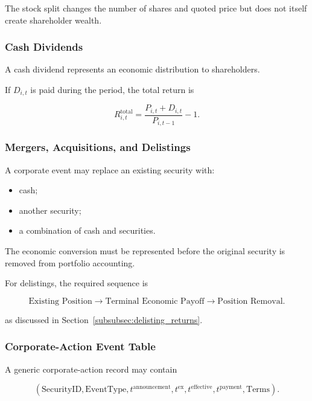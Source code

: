 \documentclass[11pt,a4paper]{article}
\begin{document}
The stock split changes the number of shares and quoted price but does not
itself create shareholder wealth.


\subsubsection{Cash Dividends}

A cash dividend represents an economic distribution to shareholders.

If $D_{i,t}$ is paid during the period, the total return is

\begin{equation}
R_{i,t}^{\mathrm{total}}
=
\frac{
P_{i,t}+D_{i,t}
}{
P_{i,t-1}
}
-1.
\end{equation}


\subsubsection{Mergers, Acquisitions, and Delistings}

A corporate event may replace an existing security with:

\begin{itemize}
    \item cash;
    \item another security;
    \item a combination of cash and securities.
\end{itemize}

The economic conversion must be represented before the original security is
removed from portfolio accounting.

For delistings, the required sequence is

\begin{equation}
\boxed{
\text{Existing Position}
\rightarrow
\text{Terminal Economic Payoff}
\rightarrow
\text{Position Removal}.
}
\end{equation}

as discussed in Section~\ref{subsubsec:delisting_returns}.


\subsubsection{Corporate-Action Event Table}

A generic corporate-action record may contain

\begin{equation}
\boxed{
\left(
\mathrm{SecurityID},
\mathrm{EventType},
t^{\mathrm{announcement}},
t^{\mathrm{ex}},
t^{\mathrm{effective}},
t^{\mathrm{payment}},
\mathrm{Terms}
\right).
}
\end{equation}
\end{document}
